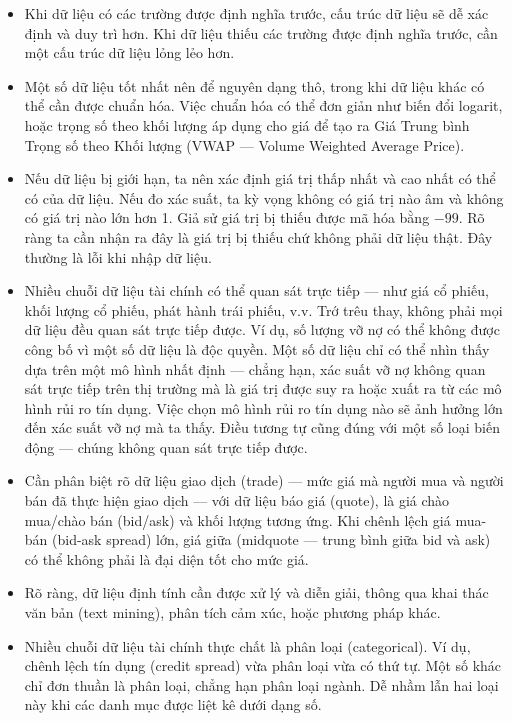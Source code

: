 \begin{itemize}
  \item Khi dữ liệu có các trường được định nghĩa trước, cấu trúc dữ liệu sẽ dễ xác định và duy trì hơn. Khi dữ liệu thiếu các trường được định nghĩa trước, cần một cấu trúc dữ liệu lỏng lẻo hơn.
  \item Một số dữ liệu tốt nhất nên để nguyên dạng thô, trong khi dữ liệu khác có thể cần được chuẩn hóa. Việc chuẩn hóa có thể đơn giản như biến đổi logarit, hoặc trọng số theo khối lượng áp dụng cho giá để tạo ra Giá Trung bình Trọng số theo Khối lượng (VWAP — Volume Weighted Average Price).
  \item Nếu dữ liệu bị giới hạn, ta nên xác định giá trị thấp nhất và cao nhất có thể có của dữ liệu. Nếu đo xác suất, ta kỳ vọng không có giá trị nào âm và không có giá trị nào lớn hơn 1. Giả sử giá trị bị thiếu được mã hóa bằng $-99$. Rõ ràng ta cần nhận ra đây là giá trị bị thiếu chứ không phải dữ liệu thật. Đây thường là lỗi khi nhập dữ liệu.
  \item Nhiều chuỗi dữ liệu tài chính có thể quan sát trực tiếp — như giá cổ phiếu, khối lượng cổ phiếu, phát hành trái phiếu, v.v. Trớ trêu thay, không phải mọi dữ liệu đều quan sát trực tiếp được. Ví dụ, số lượng vỡ nợ có thể không được công bố vì một số dữ liệu là độc quyền. Một số dữ liệu chỉ có thể nhìn thấy dựa trên một mô hình nhất định — chẳng hạn, xác suất vỡ nợ không quan sát trực tiếp trên thị trường mà là giá trị được suy ra hoặc xuất ra từ các mô hình rủi ro tín dụng. Việc chọn mô hình rủi ro tín dụng nào sẽ ảnh hưởng lớn đến xác suất vỡ nợ mà ta thấy. Điều tương tự cũng đúng với một số loại biến động — chúng không quan sát trực tiếp được.
  \item Cần phân biệt rõ dữ liệu giao dịch (trade) — mức giá mà người mua và người bán đã thực hiện giao dịch — với dữ liệu báo giá (quote), là giá chào mua/chào bán (bid/ask) và khối lượng tương ứng. Khi chênh lệch giá mua-bán (bid-ask spread) lớn, giá giữa (midquote — trung bình giữa bid và ask) có thể không phải là đại diện tốt cho mức giá.
  \item Rõ ràng, dữ liệu định tính cần được xử lý và diễn giải, thông qua khai thác văn bản (text mining), phân tích cảm xúc, hoặc phương pháp khác.
  \item Nhiều chuỗi dữ liệu tài chính thực chất là phân loại (categorical). Ví dụ, chênh lệch tín dụng (credit spread) vừa phân loại vừa có thứ tự. Một số khác chỉ đơn thuần là phân loại, chẳng hạn phân loại ngành. Dễ nhầm lẫn hai loại này khi các danh mục được liệt kê dưới dạng số.

\end{itemize}
